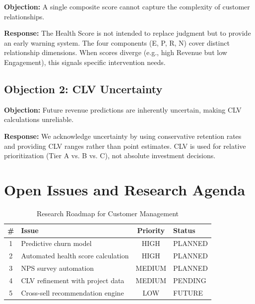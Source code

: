 \textbf{Objection:} A single composite score cannot capture the complexity
of customer relationships.

\textbf{Response:} The Health Score is not intended to replace judgment but
to provide an early warning system. The four components (E, P, R, N) cover
distinct relationship dimensions. When scores diverge (e.g., high Revenue
but low Engagement), this signals specific intervention needs.

\subsection{Objection 2: CLV Uncertainty}

\textbf{Objection:} Future revenue predictions are inherently uncertain,
making CLV calculations unreliable.

\textbf{Response:} We acknowledge uncertainty by using conservative retention
rates and providing CLV ranges rather than point estimates. CLV is used for
relative prioritization (Tier A vs. B vs. C), not absolute investment decisions.


\section{Open Issues and Research Agenda}
\label{sec:bp-open}

\begin{table}[htbp]
\centering
\caption{Research Roadmap for Customer Management}
\label{tab:bp-roadmap}
\renewcommand{\arraystretch}{1.3}
\begin{tabular}{@{}clcl@{}}
\toprule
\textbf{\#} & \textbf{Issue} & \textbf{Priority} & \textbf{Status} \\
\midrule
1 & Predictive churn model & HIGH & PLANNED \\
2 & Automated health score calculation & HIGH & PLANNED \\
3 & NPS survey automation & MEDIUM & PLANNED \\
4 & CLV refinement with project data & MEDIUM & PENDING \\
5 & Cross-sell recommendation engine & LOW & FUTURE \\
\bottomrule
\end{tabular}
\end{table}


